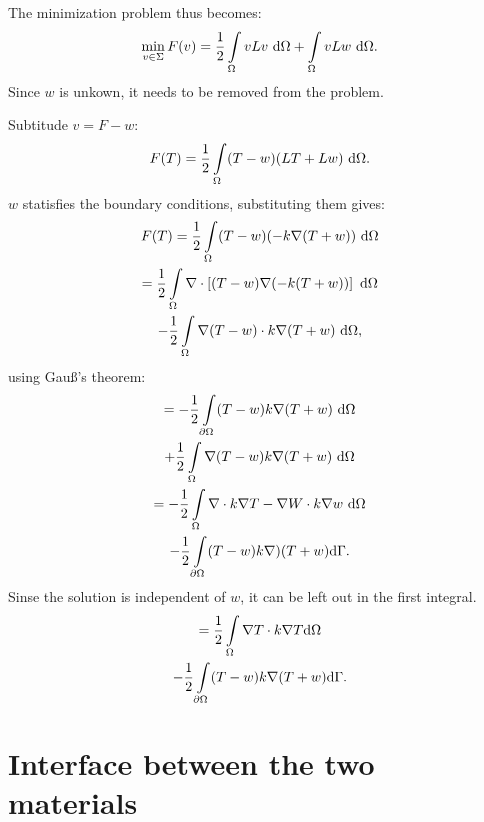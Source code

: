The minimization problem thus becomes:
\begin{equation}
    \min_{v\in\Sigma} F(v)=\frac{1}{2}\int\displaylimits_{\Omega}vLv~\text{d}\Omega + \int\displaylimits_{\Omega}vLw~\text{d}\Omega.
\end{equation} Since $w$ is unkown, it needs to be removed from the problem.

Subtitude $v=F-w$:
\begin{equation*}
F(T)=\frac{1}{2}\int\displaylimits_\Omega(T-w)(LT+Lw)~\text{d}\Omega.
\end{equation*} $w$ statisfies the boundary conditions, substituting them gives:
\begin{gather*}
    F(T) = \frac{1}{2}\int\displaylimits_{\Omega}(T-w)(-k\nabla (T+w))~\text{d}\Omega\\
    = \frac{1}{2}\int\displaylimits_{\Omega}\nabla\cdot\left[(T-w)\nabla(-k(T+w))\right]~\text{d}\Omega\\
    - \frac{1}{2}\int\displaylimits_{\Omega}\nabla(T-w)\cdot k\nabla(T+w)~\text{d}\Omega,
\end{gather*}using Gau\ss's theorem:
\begin{gather*}
    = -\frac{1}{2}\int\displaylimits_{\partial\Omega}(T-w)k\nabla(T+w)~\text{d}\Omega\\
    + \frac{1}{2}\int\displaylimits_{\Omega}\nabla(T-w)k\nabla(T+w)~\text{d}\Omega\\
    = -\frac{1}{2}\int\displaylimits_{\Omega}\nabla\cdot k\nabla T - \nabla W\cdot k\nabla w~\text{d}\Omega\\
    -\frac{1}{2}\int\displaylimits_{\partial\Omega}(T-w)k\nabla)(T+w)\text{d}\Gamma.
\end{gather*}Sinse the solution is independent of $w$, it can be left out in the first integral.
\begin{gather*}
    = \frac{1}{2}\int\displaylimits_{\Omega}\nabla T\cdot k\nabla T \text{d}\Omega \\
    -\frac{1}{2}\int\displaylimits_{\partial\Omega}(T-w)k\nabla (T+w)\text{d}\Gamma.
\end{gather*}

\section{Interface between the two materials} 
